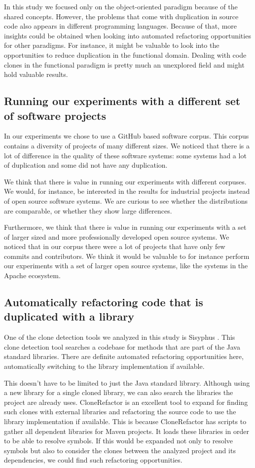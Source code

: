 In this study we focused only on the object-oriented paradigm because of the shared concepts. However, the problems that come with duplication in source code also appears in different programming languages. Because of that, more insights could be obtained when looking into automated refactoring opportunities for other paradigms. For instance, it might be valuable to look into the opportunities to reduce duplication in the functional domain. Dealing with code clones in the functional paradigm is pretty much an unexplored field and might hold valuable results.

\subsection{Running our experiments with a different set of software projects}
In our experiments we chose to use a GitHub based software corpus. This corpus contains a diversity of projects of many different sizes. We noticed that there is a lot of difference in the quality of these software systems: some systems had a lot of duplication and some did not have any duplication.

We think that there is value in running our experiments with different corpuses. We would, for instance, be interested in the results for industrial projects instead of open source software systems. We are curious to see whether the distributions are comparable, or whether they show large differences.

Furthermore, we think that there is value in running our experiments with a set of larger sized and more professionally developed open source systems. We noticed that in our corpus there were a lot of projects that have only few commits and contributors. We think it would be valuable to for instance perform our experiments with a set of larger open source systems, like the systems in the Apache ecosystem.

\subsection{Automatically refactoring code that is duplicated with a library}
One of the clone detection tools we analyzed in this study is Sisyphus \cite{eremondi2017sisyphus}. This clone detection tool searches a codebase for methods that are part of the Java standard libraries. There are definite automated refactoring opportunities here, automatically switching to the library implementation if available.

This doesn't have to be limited to just the Java standard library. Although using a new library for a single cloned library, we can also search the libraries the project are already uses. CloneRefactor is an excellent tool to expand for finding such clones with external libraries and refactoring the source code to use the library implementation if available. This is because CloneRefactor has scripts to gather all dependent libraries for Maven projects. It loads these libraries in order to be able to resolve symbols. If this would be expanded not only to resolve symbols but also to consider the clones between the analyzed project and its dependencies, we could find such refactoring opportunities.
